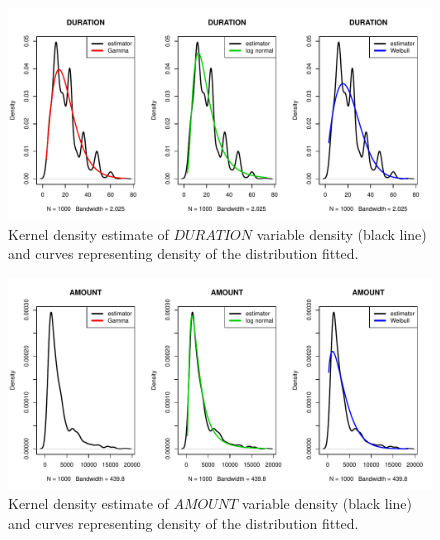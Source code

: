 \documentclass[10pt]{article}\usepackage[]{graphicx}\usepackage[]{color}
\makeatletter
\newenvironment{kframe}{%
 \def\at@end@of@kframe{}%
 \ifinner\ifhmode%
  \def\at@end@of@kframe{\end{minipage}}%
  \begin{minipage}{\columnwidth}%
 \fi\fi%
 \def\FrameCommand##1{\hskip\@totalleftmargin \hskip-\fboxsep
 \colorbox{shadecolor}{##1}\hskip-\fboxsep
     \hskip-\linewidth \hskip-\@totalleftmargin \hskip\columnwidth}%
 \MakeFramed {\advance\hsize-\width
   \@totalleftmargin\z@ \linewidth\hsize
   \@setminipage}}%
 {\par\unskip\endMakeFramed%
 \at@end@of@kframe}
\newenvironment{knitrout}{}{} %
\makeatother
\begin{document}
\begin{figure}[h!]
\centering
\begin{knitrout}
\color{fgcolor}
\includegraphics[width=.95\linewidth]{figure/unnamed-chunk-3-1} 

\end{knitrout}
\caption{Kernel density estimate of $DURATION$ variable density (black line) and curves representing density of the distribution fitted.}
\end{figure}

\begin{figure}[h!]
\centering
\begin{knitrout}
\color{fgcolor}\begin{kframe}


{\ttfamily\noindent\bfseries\color{errorcolor}{\#\# Error in stats::optim(x = c(1169, 5951, 2096, 7882, 4870, 9055, 2835, : non-finite finite-difference value [1]}}\end{kframe}
\includegraphics[width=.95\linewidth]{figure/unnamed-chunk-4-1} 

\end{knitrout}
\caption{Kernel density estimate of $AMOUNT$ variable density (black line) and curves representing density of the distribution fitted.}
\end{figure}
\end{document}

